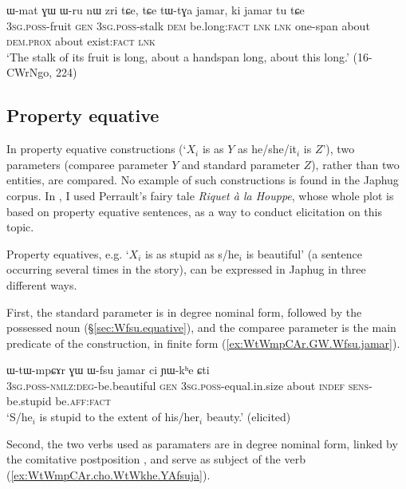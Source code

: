 \begin{exe}
\ex \label{ex:ki.jamar.tu}
\gll ɯ-mat ɣɯ ɯ-ru nɯ zri tɕe, tɕe tɯ-tɣa jamar, ki jamar tu tɕe \\
\textsc{3sg}.\textsc{poss}-fruit \textsc{gen} \textsc{3sg}.\textsc{poss}-stalk \textsc{dem} be.long:\textsc{fact} \textsc{lnk} \textsc{lnk} one-span about \textsc{dem}.\textsc{prox} about exist:\textsc{fact} \textsc{lnk} \\
\glt `The stalk of its fruit is long, about a handspan long, about this long.' (16-CWrNgo, 224)
\end{exe}
 

\subsection{Property equative}
In property equative constructions (`$X_i$ is as $Y$ as he/she/it$_i$ is $Z$'),  two parameters (comparee parameter $Y$ and standard parameter $Z$), rather than two entities, are compared. No example of such constructions is found in the Japhug corpus. In \citet{jacques18similative}, I used Perrault's fairy tale \textit{Riquet à la Houppe}, whose whole plot is based on property equative sentences, as a way to conduct elicitation on this topic.

Property equatives, e.g. `$X_i$ is as stupid as s/he$_i$ is beautiful' (a sentence occurring several times in the story), can be expressed in Japhug in three different ways.

First, the standard parameter is in degree nominal form, followed by the possessed noun   (§\ref{sec:Wfsu.equative}), and the comparee parameter is the main predicate of the construction, in finite form (\ref{ex:WtWmpCAr.GW.Wfsu.jamar}).


\begin{exe}
\ex \label{ex:WtWmpCAr.GW.Wfsu.jamar}
\gll ɯ-tɯ-mpɕɤr ɣɯ ɯ-fsu jamar ci ɲɯ-kʰe ɕti \\
\textsc{3sg}.\textsc{poss}-\textsc{nmlz}:\textsc{deg}-be.beautiful \textsc{gen} \textsc{3sg}.\textsc{poss}-equal.in.size about \textsc{indef} \textsc{sens}-be.stupid be.\textsc{aff}:\textsc{fact} \\
\glt `S/he$_i$ is stupid to the extent of his/her$_i$ beauty.' (elicited)
\end{exe}

Second, the two verbs used as paramaters are in degree nominal form, linked by the comitative postposition , and serve as subject of the verb  (\ref{ex:WtWmpCAr.cho.WtWkhe.YAfsuja}).

